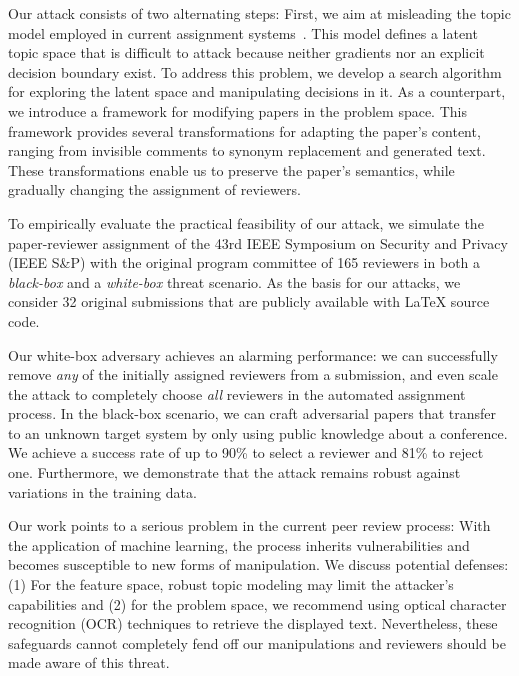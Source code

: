 \documentclass[letterpaper,twocolumn,10pt]{article}
\begin{document}
Our attack consists of two alternating steps: 
First, we aim at misleading the topic model employed in current assignment systems~\cite{charlin-13-toronto, misc-autobid}. This model defines a latent topic space that is difficult to attack because neither {gradients\EndAccSupp{}} nor an explicit decision boundary exist. To address this problem, we develop a search algorithm for exploring the latent space and manipulating decisions in it.
As a counterpart, we introduce a framework for modifying papers in the problem space. This framework provides several transformations for adapting the paper's content, ranging from {invisible\EndAccSupp{}} comments to synonym replacement and generated text. These transformations enable us to preserve the paper's semantics, while gradually changing the assignment of reviewers.

To empirically evaluate the practical feasibility of our attack, we simulate the paper-reviewer assignment of the 43rd IEEE Symposium on Security and Privacy (IEEE S\&P) with the original program {committee\EndAccSupp{}} of 165 reviewers in both a \emph{black-box} and a \emph{white-box} threat scenario. As the basis for our attacks, we consider 32 original submissions that are publicly available with \LaTeX{} source code. 

Our white-box adversary achieves an alarming performance: we can successfully remove \emph{any} of the initially assigned reviewers from a submission, and even scale the attack to completely choose \emph{all} reviewers in the automated assignment process. 
In the black-box scenario, we can craft adversarial papers that transfer to an unknown target system by only using public knowledge about a conference. We achieve a success rate of up to 90\% to select a reviewer and 81\% to reject one. Furthermore, we demonstrate that the attack remains robust against variations in the training data.

Our work points to a serious problem in the current peer review process: With the application of machine learning, the process {inherits\EndAccSupp{}} vulnerabilities and becomes {susceptible\EndAccSupp{}} to new forms of manipulation.
We discuss potential defenses: (1) For the feature space, robust topic modeling may limit the attacker's capabilities and (2) for the problem space, we recommend using optical character recognition (OCR) techniques to retrieve the displayed text.
Nevertheless, these {safeguards\EndAccSupp{}} cannot completely fend off our manipulations and reviewers should be made aware of this threat.
\end{document}
